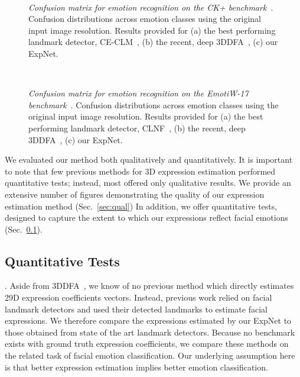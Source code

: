 \documentclass[a4paper, 10pt, conference]{ieeeconf}
\newcommand{\minisection}[1]{\vspace{2mm}\noindent{\bf #1}.}
\begin{document}
\begin{figure*}[tb]
\centering
{}
~
~
\caption{
{\em Confusion matrix for emotion recognition on the CK+ benchmark~\cite{lucey2010extended}}. Confusion distributions across emotion classes using the original input image resolution. Results provided for (a) the best performing landmark detector, CE-CLM~\cite{zadeh2016deep}, (b) the recent, deep 3DDFA~\cite{zhu2015}, (c) our ExpNet.
}
\label{fig:exp_conf}
\end{figure*}


\begin{figure*}[tb]
\centering
{}
~
~
\caption{
{\em Confusion matrix for emotion recognition on the EmotiW-17 benchmark~\cite{dhall2017individual}}. Confusion distributions across emotion classes using the original input image resolution. Results provided for (a) the best performing landmark detector, CLNF~\cite{baltrusaitis2013constrained}, (b) the recent, deep 3DDFA~\cite{zhu2015}, (c) our ExpNet.
}
\label{fig:exp_conf_emotiw17}
\end{figure*}


We evaluated our method both qualitatively and quantitatively. It is important to note that few previous methods for 3D expression estimation performed quantitative tests; instead, most offered only qualitative results. We provide an extensive number of figures demonstrating the quality of our expression estimation method (Sec.~\ref{sec:qual}) In addition, we offer quantitative tests, designed to capture the extent to which our expressions reflect facial emotions (Sec.~\ref{sec:quant}).

\subsection{Quantitative Tests}\label{sec:quant}
\minisection{Benchmark settings} Aside from 3DDFA~\cite{zhu2015}, we know of no previous method which directly estimates 29D expression coefficients vectors. Instead, previous work relied on facial landmark detectors and used their detected landmarks to estimate facial expressions. We therefore compare the expressions estimated by our ExpNet to those obtained from state of the art landmark detectors. Because no benchmark exists with ground truth expression coefficients, we compare these methods on the related task of facial emotion classification. Our underlying assumption here is that better expression estimation implies better emotion classification.
\end{document}
